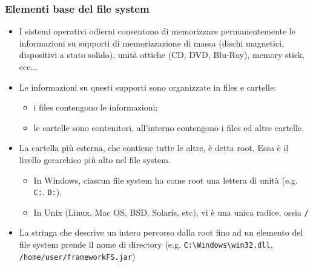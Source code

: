 \documentclass{beamer}
\begin{document}
\begin{frame}
\frametitle{Elementi base del file system}
\begin{itemize}
 \item I sistemi operativi odierni consentono di memorizzare permanentemente le informazioni su supporti di memorizzazione di massa (dischi magnetici, dispositivi a stato solido), unità ottiche (CD, DVD, Blu-Ray), memory stick, ecc...
 \item Le informazioni su questi supporti sono organizzate in files e cartelle:
  \begin{itemize}
    \item i files contengono le informazioni;
    \item le cartelle sono contenitori, all'interno contengono i files ed altre cartelle.
  \end{itemize}
 \item La cartella più esterna, che contiene tutte le altre, è detta root. Essa è il livello gerarchico più alto nel file system.
  \begin{itemize}
    \item In Windows, ciascun file system ha come root una lettera di unità (e.g. \texttt{C:}, \texttt{D:}).
    \item In Unix (Linux, Mac OS, BSD, Solaris, etc), vi è una unica radice, ossia \texttt{/}
  \end{itemize}
 \item La stringa che descrive un intero percorso dalla root fino ad un elemento del file system prende il nome di directory (e.g. \texttt{C:\textbackslash{}Windows\textbackslash{}win32.dll}, \texttt{/home/user/frameworkFS.jar})
\end{itemize}
\end{frame}
\end{document}
